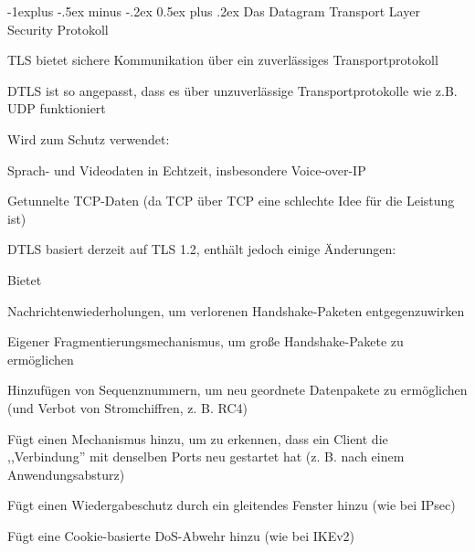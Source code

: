 \documentclass[a4paper]{article}
\makeatletter
\renewcommand{\subsection}{\@startsection{subsection}{2}{0mm}%
 {-1explus -.5ex minus -.2ex}%
 {0.5ex plus .2ex}%
 {\normalfont\normalsize\bfseries}}
\makeatother
\begin{document}
\begin{multicols}{3}
      \subsection{Das Datagram Transport Layer Security Protokoll}
      \begin{itemize*}
            \item TLS bietet sichere Kommunikation über ein zuverlässiges Transportprotokoll
            \item DTLS ist so angepasst, dass es über unzuverlässige Transportprotokolle wie z.B. UDP funktioniert
            \item Wird zum Schutz verwendet:
            \begin{itemize*}
                  \item Sprach- und Videodaten in Echtzeit, insbesondere Voice-over-IP
                  \item Getunnelte TCP-Daten (da TCP über TCP eine schlechte Idee für die Leistung ist)
            \end{itemize*}
            \item DTLS basiert derzeit auf TLS 1.2, enthält jedoch einige Änderungen:
            \begin{itemize*}
                  \item Bietet
                  \begin{itemize*}
                        \item Nachrichtenwiederholungen, um verlorenen Handshake-Paketen entgegenzuwirken
                        \item Eigener Fragmentierungsmechanismus, um große Handshake-Pakete zu ermöglichen
                  \end{itemize*}
                  \item Hinzufügen von Sequenznummern, um neu geordnete Datenpakete zu ermöglichen (und Verbot von Stromchiffren, z. B. RC4)
                  \item Fügt einen Mechanismus hinzu, um zu erkennen, dass ein Client die ,,Verbindung'' mit denselben Ports neu gestartet hat (z. B. nach einem Anwendungsabsturz)
                  \item Fügt einen Wiedergabeschutz durch ein gleitendes Fenster hinzu (wie bei IPsec)
                  \item Fügt eine Cookie-basierte DoS-Abwehr hinzu (wie bei IKEv2)
            \end{itemize*}
      \end{itemize*}


\end{multicols}
\end{document}
